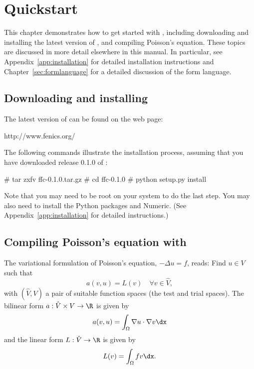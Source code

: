 \chapter{Quickstart}

This chapter demonstrates how to get started with \ffc{}, including
downloading and installing the latest version of \ffc{}, and compiling
Poisson's equation. These topics are discussed in more detail
elsewhere in this manual. In particular, see
Appendix~\ref{app:installation} for detailed installation instructions
and Chapter~\ref{sec:formlanguage} for a detailed discussion of the
form language.

\section{Downloading and installing \ffc{}}

The latest version of \ffc{} can be found on the \fenics{} web page:
\begin{code}
  http://www.fenics.org/
\end{code}
The following commands illustrate the installation process, assuming
that you have downloaded release 0.1.0 of \ffc{}:
\begin{code}
  # tar zxfv ffc-0.1.0.tar.gz
  # cd ffc-0.1.0
  # python setup.py install
\end{code}

Note that you may need to be root on your system to do the last
step. You may also need to install the Python packages \fiat{} and
Numeric. (See Appendix~\ref{app:installation} for detailed instructions.)

\section{Compiling Poisson's equation with \ffc{}}

The variational formulation of Poisson's equation, $-\Delta u = f$, reads:
Find $u \in V$ such that
\begin{equation} \label{eq:varform}
  a(v, u) = L(v) \quad \forall v\in \hat{V}, 
\end{equation}
with $(\hat{V}, V)$ a pair of suitable function spaces (the test and
trial spaces). The bilinear form $a : \hat{V} \times V \rightarrow
\R$ is given by
\begin{equation}
  a(v, u) = \int_{\Omega} \nabla u \cdot \nabla v \dx
\end{equation}
and the linear form $L : \hat{V} \rightarrow \R$ is given by
\begin{equation}
  L(v) = \int_{\Omega} f v \dx.
\end{equation}

